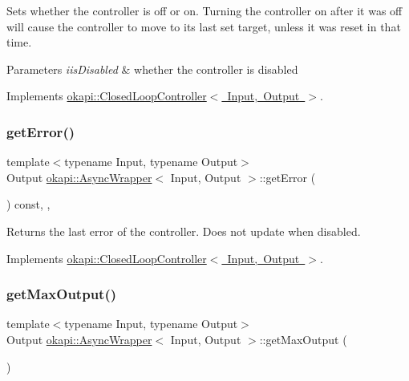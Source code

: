 Sets whether the controller is off or on. Turning the controller on after it was off will cause the controller to move to its last set target, unless it was reset in that time.


\begin{DoxyParams}{Parameters}
{\em iis\+Disabled} & whether the controller is disabled \\
\hline
\end{DoxyParams}


Implements \mbox{\hyperlink{classokapi_1_1ClosedLoopController_a768cd1db40ce9cd5c89b20be6e838ccc}{okapi\+::\+Closed\+Loop\+Controller$<$ Input, Output $>$}}.

\mbox{\label{classokapi_1_1AsyncWrapper_a64b690883ff7475375a6d08ad3fb62f9}} 
\subsubsection{\texorpdfstring{getError()}{getError()}}
{\footnotesize\ttfamily template$<$typename Input, typename Output$>$ \\
Output \mbox{\hyperlink{classokapi_1_1AsyncWrapper}{okapi\+::\+Async\+Wrapper}}$<$ Input, Output $>$\+::get\+Error (\begin{DoxyParamCaption}{ }\end{DoxyParamCaption}) const\hspace{0.3cm}{\ttfamily [inline]}, {\ttfamily [override]}, {\ttfamily [virtual]}}

Returns the last error of the controller. Does not update when disabled. 

Implements \mbox{\hyperlink{classokapi_1_1ClosedLoopController_a50c73444ff6e3e631951c43d0f951953}{okapi\+::\+Closed\+Loop\+Controller$<$ Input, Output $>$}}.

\mbox{\label{classokapi_1_1AsyncWrapper_a95112bac1792ef04010cd97efa135998}} 
\subsubsection{\texorpdfstring{getMaxOutput()}{getMaxOutput()}}
{\footnotesize\ttfamily template$<$typename Input, typename Output$>$ \\
Output \mbox{\hyperlink{classokapi_1_1AsyncWrapper}{okapi\+::\+Async\+Wrapper}}$<$ Input, Output $>$\+::get\+Max\+Output (\begin{DoxyParamCaption}{ }\end{DoxyParamCaption})\hspace{0.3cm}{\ttfamily [inline]}}

